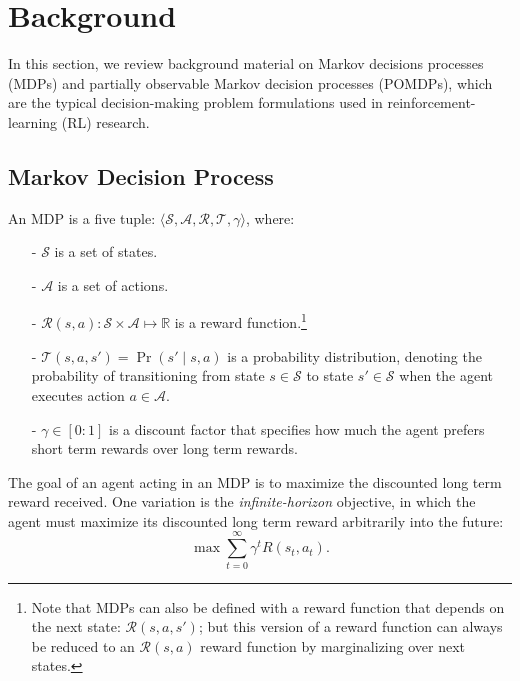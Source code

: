 \documentclass[11pt]{article}
\begin{document}
\section{Background}

In this section, we review background material on Markov decisions processes (MDPs) and partially observable Markov decision processes (POMDPs), which are the typical decision-making problem formulations used in reinforcement-learning (RL) research.

\subsection{Markov Decision Process}

An MDP is a five tuple: $\langle \mathcal{S}, \mathcal{A}, \mathcal{R}, \mathcal{T}, \gamma \rangle$, where:
\begin{itemize}
\item[-] $\mathcal{S}$ is a set of states.
\item[-] $\mathcal{A}$ is a set of actions.
\item[-] $\mathcal{R}(s,a) : \mathcal{S} \times \mathcal{A} \mapsto \mathbb{R}$ is a reward function.\footnote{Note that MDPs can also be defined with a reward function that depends on the next state: $\mathcal{R}(s,a,s')$; but this version of a reward function can always be reduced to an $\mathcal{R}(s,a)$ reward function by marginalizing over next states.}
\item[-] $\mathcal{T}(s,a,s') = \Pr(s' \mid s, a)$ is a probability distribution, denoting the probability of transitioning from state $s \in \mathcal{S}$ to state $s' \in \mathcal{S}$ when the agent executes action $a \in \mathcal{A}$.
\item[-] $\gamma \in [0:1]$ is a discount factor that specifies how much the agent prefers short term rewards over long term rewards.
\end{itemize}

The goal of an agent acting in an MDP is to maximize the discounted long term reward received. 
One variation is the {\it infinite-horizon} objective, in which the agent must maximize its discounted long term reward arbitrarily into the future:
\begin{equation}
\max \sum_{t=0}^{\infty} \gamma^t R(s_t,a_t).
\end{equation}
\end{document}
